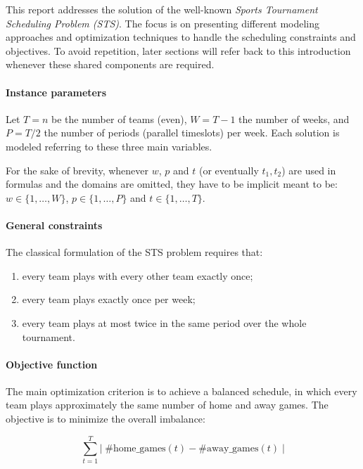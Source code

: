 This report addresses the solution of the well-known \emph{Sports Tournament Scheduling Problem (STS\cite{csplib_prob026})}.
The focus is on presenting different modeling approaches and optimization techniques to handle the scheduling constraints and objectives.  
To avoid repetition, later sections will refer back to this introduction whenever these shared components are required.

\paragraph{Instance parameters}
Let \(T=n\) be the number of teams (even), \(W=T-1\) the number of weeks, and \(P=T/2\) the number of periods (parallel timeslots) per week.
Each solution is modeled referring to these three main variables.

For the sake of brevity, whenever $w$, $p$ and $t$ (or eventually $t_1, t_2$) are used in formulas and the domains are omitted, they have to be implicit meant to be: 
$w \in \{1,\dots, W\}$, $p \in \{1,\dots, P\}$ and $t \in \{1,\dots, T\}$.

\paragraph{General constraints}
The classical formulation of the STS problem requires that:
\begin{enumerate}
    \item every team plays with every other team exactly once;
    \item every team plays exactly once per week;
    \item every team plays at most twice in the same period over the whole tournament.
\end{enumerate}

\paragraph{Objective function}

The main optimization criterion is to achieve a balanced schedule,
in which every team plays approximately the same number of home and away
games. 
The objective is to minimize the overall imbalance:

\[
\sum_{t=1}^{T} \Big| \; 
\#\text{home\_games}(t) - \#\text{away\_games}(t) \; \Big|
\]

